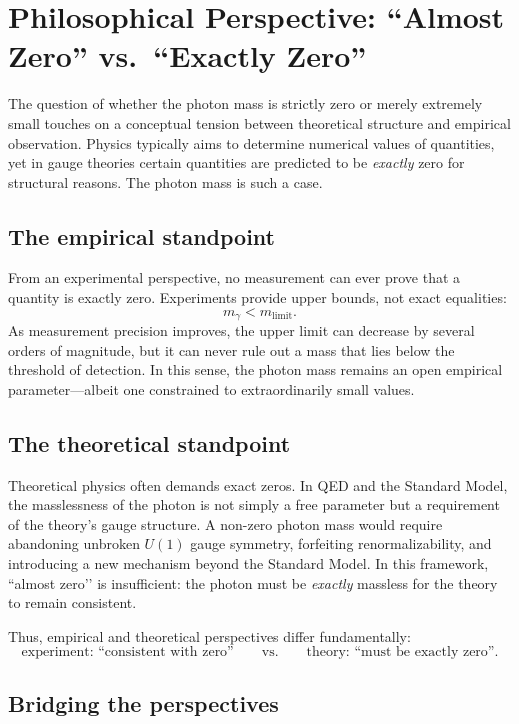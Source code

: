 \section{Philosophical Perspective: “Almost Zero” vs.\ “Exactly Zero”}

The question of whether the photon mass is strictly zero or merely extremely 
small touches on a conceptual tension between theoretical structure and 
empirical observation. Physics typically aims to determine numerical values 
of quantities, yet in gauge theories certain quantities are predicted to be 
\emph{exactly} zero for structural reasons. The photon mass is such a case.

\subsection*{The empirical standpoint}

From an experimental perspective, no measurement can ever prove that a 
quantity is exactly zero. Experiments provide upper bounds, not exact 
equalities:
\[
m_\gamma < m_{\mathrm{limit}}.
\]
As measurement precision improves, the upper limit can decrease by several 
orders of magnitude, but it can never rule out a mass that lies below the 
threshold of detection. In this sense, the photon mass remains an open 
empirical parameter—albeit one constrained to extraordinarily small values.

\subsection*{The theoretical standpoint}

Theoretical physics often demands exact zeros. In QED and the Standard 
Model, the masslessness of the photon is not simply a free parameter but a 
requirement of the theory’s gauge structure. A non-zero photon mass would 
require abandoning unbroken $U(1)$ gauge symmetry, forfeiting 
renormalizability, and introducing a new mechanism beyond the Standard 
Model. In this framework, ``almost zero’’ is insufficient: the photon must 
be \emph{exactly} massless for the theory to remain consistent.

Thus, empirical and theoretical perspectives differ fundamentally:
\[
\text{experiment: ``consistent with zero''} 
\qquad\text{vs.}\qquad
\text{theory: ``must be exactly zero''}.
\]

\subsection*{Bridging the perspectives}

